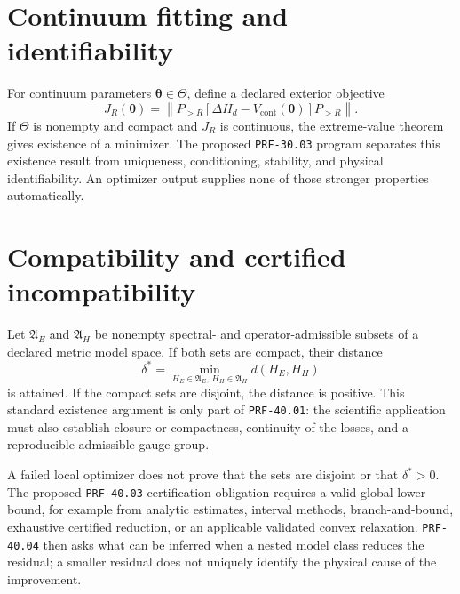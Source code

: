 
\section{Continuum fitting and identifiability}


For continuum parameters $\boldsymbol\theta\in\Theta$, define a declared
exterior objective
\begin{equation}
  J_R(\boldsymbol\theta)
  =
  \left\|
    P_{>R}
    [\Delta H_d-V_{\mathrm{cont}}(\boldsymbol\theta)]
    P_{>R}
  \right\|.
\end{equation}
If $\Theta$ is nonempty and compact and $J_R$ is continuous, the extreme-value
theorem gives existence of a minimizer. The proposed \texttt{PRF-30.03}
program separates this existence result from uniqueness, conditioning,
stability, and physical identifiability. An optimizer output supplies none of
those stronger properties automatically.

\section{Compatibility and certified incompatibility}


Let $\mathfrak A_E$ and $\mathfrak A_H$ be nonempty spectral- and
operator-admissible subsets of a declared metric model space. If both sets are
compact, their distance
\begin{equation}
  \delta^{\ast}
  =
  \min_{H_E\in\mathfrak A_E,\,H_H\in\mathfrak A_H}
  d(H_E,H_H)
\end{equation}
is attained. If the compact sets are disjoint, the distance is positive. This
standard existence argument is only part of \texttt{PRF-40.01}: the scientific
application must also establish closure or compactness, continuity of the
losses, and a reproducible admissible gauge group.

A failed local optimizer does not prove that the sets are disjoint or that
$\delta^{\ast}>0$. The proposed \texttt{PRF-40.03} certification obligation
requires a valid global lower bound, for example from analytic estimates,
interval methods, branch-and-bound, exhaustive certified reduction, or an
applicable validated convex relaxation. \texttt{PRF-40.04} then asks what can be
inferred when a nested model class reduces the residual; a smaller residual does
not uniquely identify the physical cause of the improvement.

